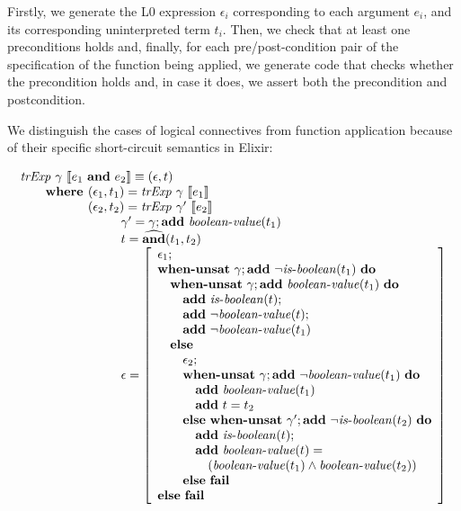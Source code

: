 Firstly, we generate the L0 expression $\epsilon_i$ corresponding to each 
argument $e_i$, and its corresponding uninterpreted term $t_i$. Then, we check 
that at least one preconditions holds and, finally, for each pre/post-condition
pair of the specification of the function being applied, we generate code that
checks whether the precondition holds and, in case it does, we assert both the
precondition and postcondition.

We distinguish the cases of logical connectives from function application
because of their specific short-circuit semantics in Elixir:

\[
\begin{array}{l}
\trExp{\gamma}{\andE{e_1}{e_2}} \equiv (\epsilon, t)\\
\qquad \textbf{where }(\epsilon_1, t_1) = \trExp{\gamma}{e_1}\\
\qquad \phantom{\textbf{where }}(\epsilon_2, t_2) = \trExp{\gamma'}{e_2}\\
\qquad\qquad\qquad\qquad \gamma' = \gamma;\addE~\booleanvalue{t_1}\\
\qquad\qquad\qquad\qquad t = \widehat{\mathbf{and}}(t_1, t_2)\\
\qquad\qquad\qquad\qquad \epsilon = \left[ 
\begin{array}{l}
\epsilon_1;\\
\whenUnsatW~\gamma;\addE~\neg\isboolean{t_1}~\doW\\
\quad\whenUnsatW~\gamma;\addE~\booleanvalue{t_1}~\doW\\
\quad\quad\addE~\isboolean{t};\\
\quad\quad\addE~\neg\booleanvalue{t};\\
\quad\quad\addE~\neg\booleanvalue{t_1}\\
\quad\elseW\\
\quad\quad\epsilon_2;\\
\quad\quad\whenUnsatW~\gamma;\addE~\neg\booleanvalue{t_1}~\doW\\
\quad\quad\quad\addE~\booleanvalue{t_1}\\
\quad\quad\quad\addE~t = t_2\\
\quad\quad\elseW~\whenUnsatW~\gamma';\addE~\neg\isboolean{t_2}~\doW\\
\quad\quad\quad\addE~\isboolean{t};\\
\quad\quad\quad\addE~\booleanvalue{t} = \\
\quad\quad\quad\quad(\booleanvalue{t_1} \land \booleanvalue{t_2})\\
\quad\quad\elseW~\failE\\
\elseW~\failE
\end{array}
\right] \\
\end{array}
\]

